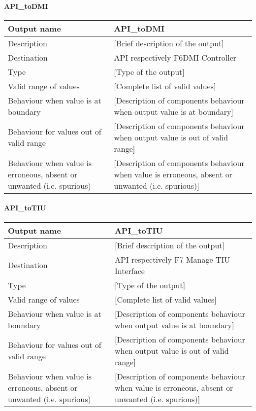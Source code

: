 \paragraph{API\_toDMI}

\begin{longtable}{p{}p{}}
\toprule
Output name				& API\_toDMI \\
\midrule
Description				& [Brief description of the output] \\
\midrule
Destination				& API respectively F6DMI Controller \\ 
\midrule
Type					& [Type of the output] \\
\midrule
Valid range of values	& [Complete list of valid values] \\
\midrule
Behaviour when value is at boundary	& [Description of components behaviour when output value is at boundary] \\
\midrule
Behaviour for values out of valid range	& [Description of components behaviour when output value is out of valid range] \\
\midrule
Behaviour when value is erroneous, absent or unwanted (i.e. spurious) & [Description of components behaviour when value is erroneous, absent or unwanted (i.e. spurious)] \\
\bottomrule
\end{longtable}

\paragraph{API\_toTIU}

\begin{longtable}{p{}p{}}
\toprule
Output name				& API\_toTIU \\
\midrule
Description				& [Brief description of the output] \\
\midrule
Destination				& API respectively F7 Manage TIU Interface \\ 
\midrule
Type					& [Type of the output] \\
\midrule
Valid range of values	& [Complete list of valid values] \\
\midrule
Behaviour when value is at boundary	& [Description of components behaviour when output value is at boundary] \\
\midrule
Behaviour for values out of valid range	& [Description of components behaviour when output value is out of valid range] \\
\midrule
Behaviour when value is erroneous, absent or unwanted (i.e. spurious) & [Description of components behaviour when value is erroneous, absent or unwanted (i.e. spurious)] \\
\bottomrule
\end{longtable}